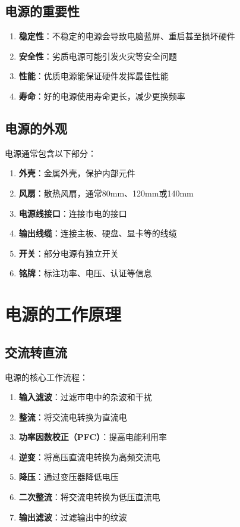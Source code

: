 \documentclass[12pt,UTF8]{ctexbook}
\begin{document}
\section{电源的重要性}

\begin{enumerate}
    \item \textbf{稳定性}：不稳定的电源会导致电脑蓝屏、重启甚至损坏硬件
    \item \textbf{安全性}：劣质电源可能引发火灾等安全问题
    \item \textbf{性能}：优质电源能保证硬件发挥最佳性能
    \item \textbf{寿命}：好的电源使用寿命更长，减少更换频率
\end{enumerate}

\section{电源的外观}

电源通常包含以下部分：

\begin{enumerate}
    \item \textbf{外壳}：金属外壳，保护内部元件
    \item \textbf{风扇}：散热风扇，通常80mm、120mm或140mm
    \item \textbf{电源线接口}：连接市电的接口
    \item \textbf{输出线缆}：连接主板、硬盘、显卡等的线缆
    \item \textbf{开关}：部分电源有独立开关
    \item \textbf{铭牌}：标注功率、电压、认证等信息
\end{enumerate}

\chapter{电源的工作原理}

\section{交流转直流}

电源的核心工作流程：

\begin{enumerate}
    \item \textbf{输入滤波}：过滤市电中的杂波和干扰
    \item \textbf{整流}：将交流电转换为直流电
    \item \textbf{功率因数校正（PFC）}：提高电能利用率
    \item \textbf{逆变}：将高压直流电转换为高频交流电
    \item \textbf{降压}：通过变压器降低电压
    \item \textbf{二次整流}：将交流电转换为低压直流电
    \item \textbf{输出滤波}：过滤输出中的纹波
\end{enumerate}
\end{document}
